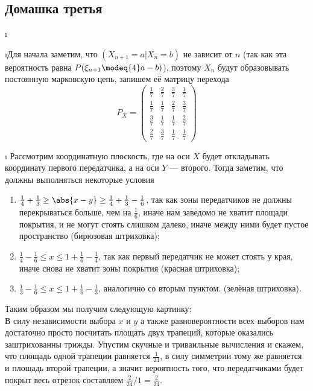 \subsection{Домашка третья}


\i 


\i Для начала заметим, что $(X_{n+1} = a | X_n = b)$ не зависит от $n$ (так как эта вероятность равна $P(\xi_{n+1} \modeq{4} a - b)$), поэтому $X_n$ будут
образовывать постоянную марковскую цепь, запишем её матрицу перехода 
    \[P_X = \begin{pmatrix}
        \frac{1}{7} & \frac{2}{7} & \frac{3}{7} & \frac{1}{7} \\ 
        \frac{1}{7} & \frac{1}{7} & \frac{2}{7} & \frac{3}{7} \\ 
        \frac{3}{7} & \frac{1}{7} & \frac{1}{7} & \frac{2}{7} \\ 
        \frac{2}{7} & \frac{3}{7} & \frac{1}{7} & \frac{1}{7}
    \end{pmatrix}\]


\i 
Рассмотрим координатную плоскость, где на оси $X$ будет откладывать координату первого передатчика, а на оси $Y$ --- второго. Тогда заметим, что должны выполняться
некоторые условия 
\begin{enumerate}
    \item $\frac{1}{4} + \frac{1}{3} \geq \abs{x - y} \geq \frac{1}{4} + \frac{1}{3} - \frac{1}{6}$, так как зоны передатчиков не должны перекрываться больше, чем на $\frac{1}{6}$, иначе 
        нам заведомо не хватит площади покрытия, и не могут стоять слишком далеко, иначе между ними будет пустое пространство (бирюзовая штриховка);
    \item $\frac{1}{4} - \frac{1}{6} \leq x \leq 1 + \frac{1}{6} - \frac{1}{4}$, так как первый передатчик не может стоять у края, иначе снова не хватит зоны покрытия
        (красная штриховка);
    \item $\frac{1}{3} - \frac{1}{6} \leq x \leq 1 + \frac{1}{6} - \frac{1}{3}$, аналогично со вторым пунктом. (зелёная штриховка).
\end{enumerate}
Таким образом мы получим следующую картинку:
\\
В силу независимости выбора $x$ и $y$ а также равновероятности всех выборов нам достаточно просто посчитать площать двух трапеций, которые оказались заштрихованны 
трижды. Упустим скучные и триваильные вычисления и скажем, что площадь одной трапеции равняется $\frac{1}{24}$, в силу симметрии тому же равняется и площадь 
второй трапеции, а значит вероятность того, что передатчиками будет покрыт весь отрезок составляем $\frac{2}{24} / 1 = \frac{2}{24}$.